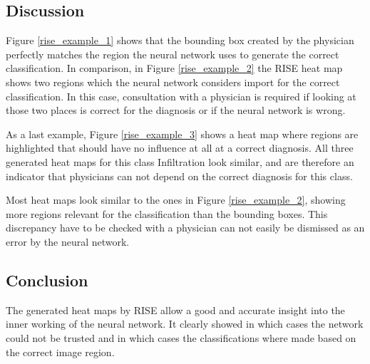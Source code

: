 \subsection{Discussion}
Figure \ref{rise_example_1} shows that the bounding box created by the physician perfectly matches the region the neural network uses to generate the correct classification. In comparison, in Figure \ref{rise_example_2} the RISE heat map shows two regions which the neural network considers import for the correct classification. In this case, consultation with a physician is required if looking at those two places is correct for the diagnosis or if the neural network is wrong.

As a last example, Figure \ref{rise_example_3} shows a heat map where regions are highlighted that should have no influence at all at a correct diagnosis. All three generated heat maps for this class Infiltration look similar, and are therefore an indicator that physicians can not depend on the correct diagnosis for this class.

Most heat maps look similar to the ones in Figure \ref{rise_example_2}, showing more regions relevant for the classification than the bounding boxes. This discrepancy have to be checked with a physician can not easily be dismissed as an error by the neural network.

\subsection{Conclusion}
The generated heat maps by RISE allow a good and accurate insight into the inner working of the neural network. It clearly showed in which cases the network could not be trusted and in which cases the classifications where made based on the correct image region.
